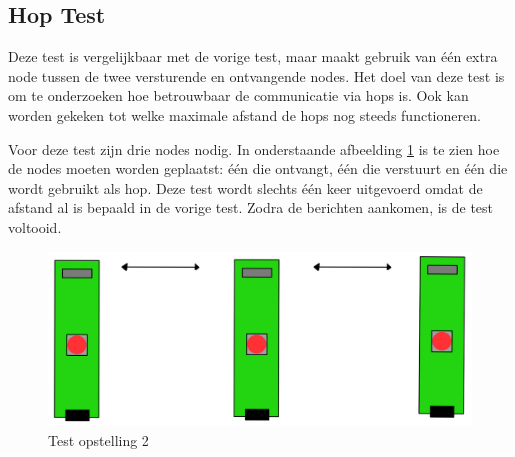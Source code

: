 \vspace{0.5cm}

\newpage
\subsection{Hop Test}
Deze test is vergelijkbaar met de vorige test, maar maakt gebruik van één extra node tussen de twee versturende en ontvangende nodes. Het doel van deze test is om te onderzoeken hoe betrouwbaar de communicatie via hops is. Ook kan worden gekeken tot welke maximale afstand de hops nog steeds functioneren.

Voor deze test zijn drie nodes nodig. In onderstaande afbeelding \ref{fig:Testhop} is te zien hoe de nodes moeten worden geplaatst: één die ontvangt, één die verstuurt en één die wordt gebruikt als hop. Deze test wordt slechts één keer uitgevoerd omdat de afstand al is bepaald in de vorige test. Zodra de berichten aankomen, is de test voltooid.
\begin{figure}[h]
    \centering
    \includegraphics[scale = 0.4]{img/test2.png}
    \caption{Test opstelling 2}
    \label{fig:Testhop}
\end{figure}


